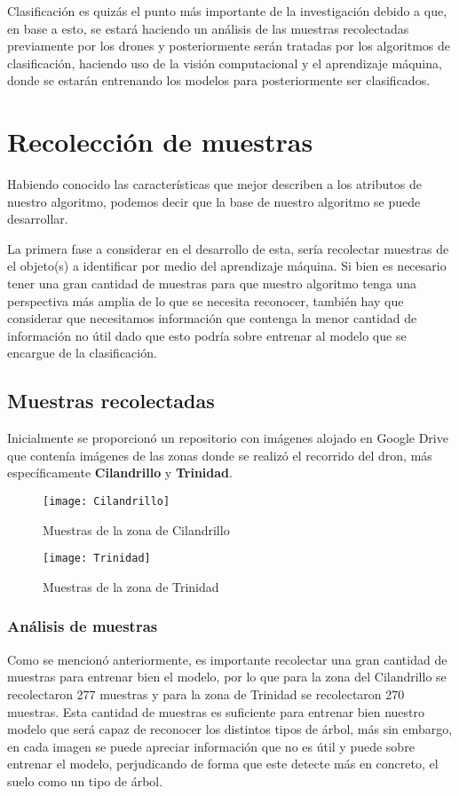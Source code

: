 Clasificación es quizás el punto más importante de la investigación debido a que, en base a esto, se estará haciendo un análisis de las muestras recolectadas previamente por los drones y posteriormente serán tratadas por los algoritmos de clasificación, haciendo uso de la visión computacional y el aprendizaje máquina, donde se estarán entrenando los modelos para posteriormente ser clasificados.


\chapter{Recolección de muestras}
Habiendo conocido las características que mejor describen a los atributos de nuestro algoritmo, podemos decir que la base de nuestro algoritmo se puede desarrollar.

La primera fase a considerar en el desarrollo de esta, sería recolectar muestras de el objeto(s) a identificar por medio del aprendizaje máquina. Si bien es necesario tener una gran cantidad de muestras para que nuestro algoritmo tenga una perspectiva más amplia de lo que se necesita reconocer, también hay que considerar que necesitamos información que contenga la menor cantidad de información no útil dado que esto podría sobre entrenar al modelo que se encargue de la clasificación.

\section{Muestras recolectadas}
Inicialmente se proporcionó un repositorio con imágenes alojado en Google Drive que contenía imágenes de las zonas donde se realizó el recorrido del dron, más específicamente \textbf{Cilandrillo} y \textbf{Trinidad}.

\begin{figure}
 \centering
\texttt{[image: Cilandrillo]}
\caption{Muestras de la zona de Cilandrillo}
\end{figure}

\begin{figure}
 \centering
\texttt{[image: Trinidad]}
\caption{Muestras de la zona de Trinidad}
\end{figure}

\subsection{Análisis de muestras}
Como se mencionó anteriormente, es importante recolectar una gran cantidad de muestras para entrenar bien el modelo, por lo que para la zona del Cilandrillo se recolectaron 277 muestras y para la zona de Trinidad se recolectaron 270 muestras. Esta cantidad de muestras es suficiente para entrenar bien nuestro modelo que será capaz de reconocer los distintos tipos de árbol, más sin embargo, en cada imagen se puede apreciar información que no es útil y puede sobre entrenar el modelo, perjudicando de forma que este detecte más en concreto, el suelo como un tipo de árbol.

